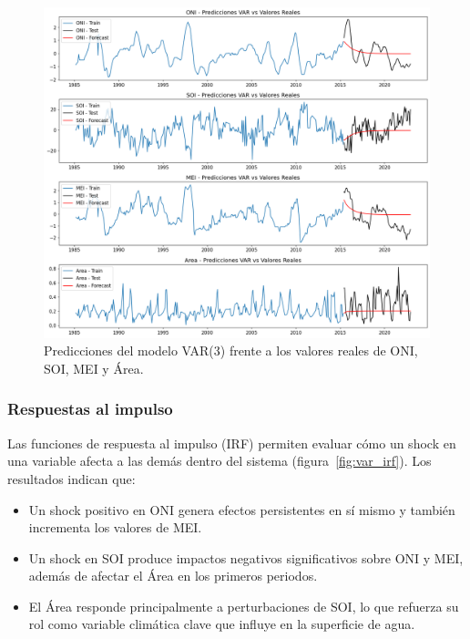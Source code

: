 \begin{figure}[H]
    \centering
    \includegraphics[scale=0.45]{Figures/var_pred.png}
    \caption{Predicciones del modelo VAR(3) frente a los valores reales de ONI, SOI, MEI y Área.}
    \label{fig:var_pred}
\end{figure}

\subsubsection{Respuestas al impulso}
Las funciones de respuesta al impulso (IRF) permiten evaluar cómo un shock en una variable afecta a las demás dentro del sistema (figura~\ref{fig:var_irf}). Los resultados indican que:

\begin{itemize}
    \item Un shock positivo en ONI genera efectos persistentes en sí mismo y también incrementa los valores de MEI.
    \item Un shock en SOI produce impactos negativos significativos sobre ONI y MEI, además de afectar el Área en los primeros periodos.
    \item El Área responde principalmente a perturbaciones de SOI, lo que refuerza su rol como variable climática clave que influye en la superficie de agua.
\end{itemize}



